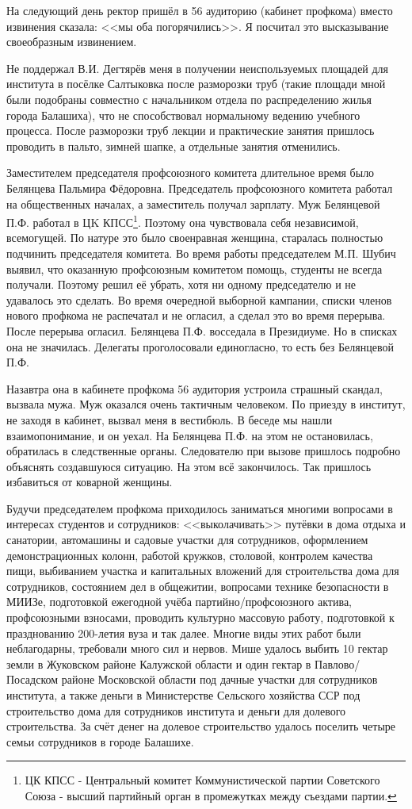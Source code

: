 На следующий день ректор пришёл в 56 аудиторию (кабинет профкома) вместо извинения сказала: <<мы оба погорячились>>. Я посчитал это высказывание своеобразным извинением.

Не поддержал В.И. Дегтярёв меня в получении неиспользуемых площадей для института в посёлке Салтыковка после разморозки труб (такие площади мной были подобраны совместно с начальником отдела по распределению жилья города Балашиха), что не способствовал нормальному ведению учебного процесса. После разморозки труб лекции и практические занятия пришлось проводить в пальто, зимней шапке, а отдельные занятия отменились.

Заместителем председателя профсоюзного комитета длительное время было Белянцева Пальмира Фёдоровна. Председатель профсоюзного комитета работал на общественных началах, а заместитель получал зарплату. Муж Белянцевой П.Ф. работал в ЦK КПСС\footnote{ЦК КПСС - Центральный комитет Коммунистической партии Советского Союза - высший партийный орган в промежутках между съездами партии.}. Поэтому она чувствовала себя независимой, всемогущей. По натуре это было своенравная женщина, старалась полностью подчинить председателя комитета. Во время работы председателем М.П. Шубич выявил, что оказанную профсоюзным комитетом помощь, студенты не всегда получали. Поэтому решил её убрать, хотя ни одному председателю и не удавалось это сделать. Во время очередной выборной кампании, списки членов нового профкома не распечатал и не огласил, а сделал это во время перерыва. После перерыва огласил. Белянцева П.Ф. восседала в Президиуме. Но в списках она не значилась. Делегаты проголосовали единогласно, то есть без Белянцевой П.Ф. 

Назавтра она в кабинете профкома 56 аудитория устроила страшный скандал, вызвала мужа. Муж оказался очень тактичным человеком. По приезду в институт, не заходя в кабинет, вызвал меня в вестибюль. В беседе мы нашли взаимопонимание, и он уехал. На Белянцева П.Ф. на этом не остановилась, обратилась в следственные органы. Следователю при вызове пришлось подробно объяснять создавшуюся ситуацию. На этом всё закончилось. Так пришлось избавиться от коварной женщины. 

Будучи председателем профкома приходилось заниматься многими вопросами в интересах студентов и сотрудников: <<выколачивать>> путёвки в дома отдыха и санатории, автомашины и садовые участки для сотрудников, оформлением демонстрационных колонн, работой кружков, столовой, контролем качества пищи, выбиванием участка и капитальных вложений для строительства дома для сотрудников, состоянием дел в общежитии, вопросами технике безопасности в МИИЗе, подготовкой ежегодной учёба партийно\-/профсоюзного актива, профсоюзными взносами, проводить культурно массовую работу, подготовкой к празднованию 200-летия вуза и так далее. Многие виды этих работ были неблагодарны, требовали много сил и нервов. Мише удалось выбить 10 гектар земли в Жуковском районе Калужской области и один гектар в Павлово\-/Посадском районе Московской области под дачные участки для сотрудников института, а также деньги в Министерстве Сельского хозяйства ССР под строительство дома для сотрудников института и деньги для долевого строительства. За счёт денег на долевое строительство удалось поселить четыре семьи сотрудников в городе Балашихе.

